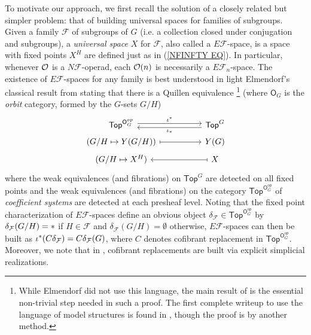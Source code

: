 \documentclass[a4paper,10pt]{article}%
\begin{document}
To motivate our approach, we first recall the solution of a closely related but simpler problem: that of building universal spaces for families of subgroups. 
Given a family $\mathcal{F}$ of subgroups of $G$ 
(i.e. a collection closed under conjugation and subgroups), a \textit{universal space} $X$ for $\mathcal{F}$, 
also called a $E \mathcal{F}$-space,
is a space with fixed points $X^H$ are defined just as in (\ref{NFINFTY EQ}).
In particular, whenever $\mathcal{O}$ is a $N \mathcal{F}$-operad, 
each $\mathcal{O}(n)$ is necessarily a $E \mathcal{F}_n$-space.
The existence of $E \mathcal{F}$-spaces for any family is 
best understood in light Elmendorf's classical result from \cite{Elm83}
stating that there is a Quillen equivalence \footnote{While Elmendorf did not use this language, the main result of \cite{Elm83} is the essential non-trivial step needed in such a proof. The first complete writeup to use the language of model structures is found in \cite{Pia91}, though the proof is by another method.}
(where $\mathsf{O}_G$ is the \textit{orbit} category, formed by the $G$-sets $G/H$)
\begin{equation}\label{COFADJINT EQ}
\begin{tikzcd}[column sep =5em,row sep=0.3em]
	\mathsf{Top}^{\mathsf{O}_G^{op}}
	\ar[shift left=1]{r}{\iota^{\**}} 
&
	\mathsf{Top}^G
	\ar[shift left=1]{l}{\iota_{\**}}
\\
	\left(G/H \mapsto Y(G/H)\right)  \ar[mapsto]{r}&
	Y(G)
\\
	(G/H \mapsto X^H) &
	X \ar[mapsto]{l}
\end{tikzcd}
\end{equation}
where the weak equivalences (and fibrations)
on $\mathsf{Top}^G$ are detected on all fixed points and
the weak equivalences (and fibrations)
on the category $\mathsf{Top}^{\mathsf{O}_G^{op}}$ of 
\textit{coefficient systems}
are detected at each presheaf level.
Noting that the fixed point characterization of $E \mathcal{F}$-spaces define an obvious object 
$\delta_{\mathcal{F}} \in \mathsf{Top}^{\mathsf{O}_G^{op}}$ by 
$\delta_{\mathcal{F}}(G/H)=\**$ if $H \in \mathcal{F}$ and
$\delta_{\mathcal{F}}(G/H)=\emptyset$ otherwise, 
$E \mathcal{F}$-spaces can then be built as
$\iota^{\**}(C \delta_{\mathcal{F}}) = 
C \delta_{\mathcal{F}}(G)$, where $C$ denotes cofibrant replacement in $\mathsf{Top}^{\mathsf{O}_G^{op}}$.
Moreover, we note that in \cite{Elm83}, cofibrant replacements are built via explicit simplicial realizations.
\end{document}
